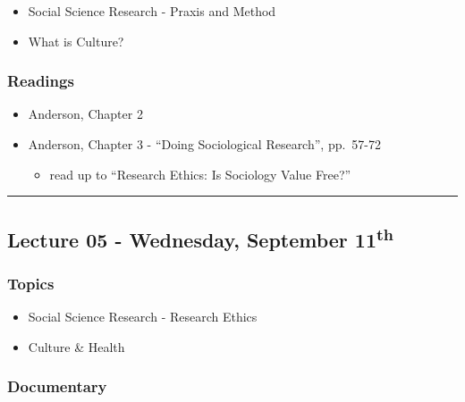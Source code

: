 \documentclass[]{book}
\providecommand{\tightlist}{%
  \setlength{\itemsep}{0pt}\setlength{\parskip}{0pt}}
\begin{document}
\begin{itemize}
\tightlist
\item
  Social Science Research - Praxis and Method
\item
  What is Culture?
\end{itemize}

\hypertarget{readings-4}{%
\subsubsection*{Readings}\label{readings-4}}

\begin{itemize}
\tightlist
\item
  Anderson, Chapter 2
\item
  Anderson, Chapter 3 - ``Doing Sociological Research'', pp.~57-72

  \begin{itemize}
  \tightlist
  \item
    read up to ``Research Ethics: Is Sociology Value Free?''
  \end{itemize}
\end{itemize}

\begin{center}\rule{0.5\linewidth}{\linethickness}\end{center}

\hypertarget{lecture-05---wednesday-september-11th}{%
\subsection*{\texorpdfstring{Lecture 05 - Wednesday, September 11\textsuperscript{th}}{Lecture 05 - Wednesday, September 11th}}\label{lecture-05---wednesday-september-11th}}

\hypertarget{topics-5}{%
\subsubsection*{Topics}\label{topics-5}}

\begin{itemize}
\tightlist
\item
  Social Science Research - Research Ethics
\item
  Culture \& Health
\end{itemize}

\hypertarget{documentary-1}{%
\subsubsection*{Documentary}\label{documentary-1}}
\end{document}
